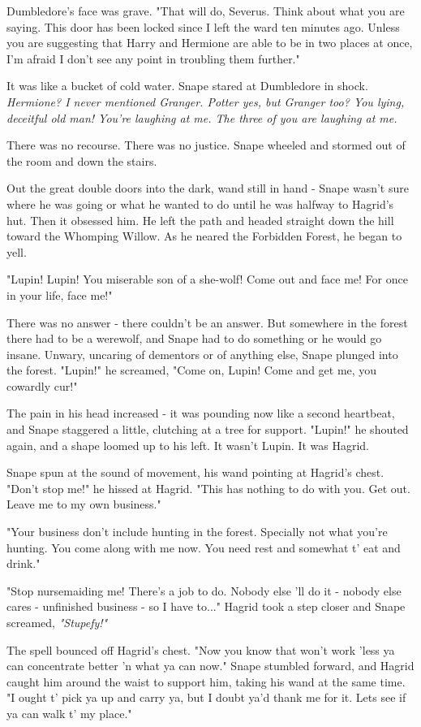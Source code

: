Dumbledore's face was grave. "That will do, Severus. Think about what you are saying. This door has been locked since I left the ward ten minutes ago. Unless you are suggesting that Harry and Hermione are able to be in two places at once, I'm afraid I don't see any point in troubling them further."

It was like a bucket of cold water. Snape stared at Dumbledore in shock. \emph{Hermione? I never mentioned Granger. Potter yes, but Granger too? You lying, deceitful old man! You're laughing at me. The three of you are laughing at me.}

There was no recourse. There was no justice. Snape wheeled and stormed out of the room and down the stairs.

Out the great double doors into the dark, wand still in hand - Snape wasn't sure where he was going or what he wanted to do until he was halfway to Hagrid's hut. Then it obsessed him. He left the path and headed straight down the hill toward the Whomping Willow. As he neared the Forbidden Forest, he began to yell.

"Lupin! Lupin! You miserable son of a she-wolf! Come out and face me! For once in your life, face me!"

There was no answer - there couldn't be an answer. But somewhere in the forest there had to be a werewolf, and Snape had to do something or he would go insane. Unwary, uncaring of dementors or of anything else, Snape plunged into the forest. "Lupin!" he screamed, "Come on, Lupin! Come and get me, you cowardly cur!"

The pain in his head increased - it was pounding now like a second heartbeat, and Snape staggered a little, clutching at a tree for support. "Lupin!" he shouted again, and a shape loomed up to his left. It wasn't Lupin. It was Hagrid.

Snape spun at the sound of movement, his wand pointing at Hagrid's chest. "Don't stop me!" he hissed at Hagrid. "This has nothing to do with you. Get out. Leave me to my own business."

"Your business don't include hunting in the forest. Specially not what you're hunting. You come along with me now. You need rest and somewhat t' eat and drink."

"Stop nursemaiding me! There's a job to do. Nobody else 'll do it - nobody else cares - unfinished business - so I have to..." Hagrid took a step closer and Snape screamed, \emph{"Stupefy!"}

The spell bounced off Hagrid's chest. "Now you know that won't work 'less ya can concentrate better 'n what ya can now." Snape stumbled forward, and Hagrid caught him around the waist to support him, taking his wand at the same time. "I ought t' pick ya up and carry ya, but I doubt ya'd thank me for it. Lets see if ya can walk t' my place."

